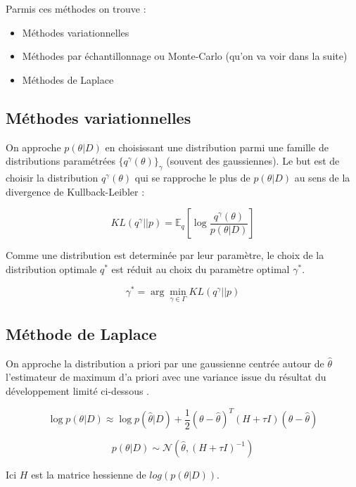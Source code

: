 \documentclass[french,12pt]{article}
\let\oldsubsection\subsection%
\renewcommand{\subsection}{%
  \renewcommand{\theequation}{\thesubsection.\arabic{equation}}%
  \oldsubsection}%
\begin{document}
Parmis ces méthodes on trouve :
\begin{itemize}
    \item Méthodes variationnelles
    \item Méthodes par échantillonnage ou
          Monte-Carlo (qu'on va voir dans la suite)
    \item Méthodes de Laplace
\end{itemize}


\subsection{Méthodes variationnelles}

On approche $p(\theta | D)$ en choisissant une distribution parmi une famille de distributions
paramétrées $\{q^{\gamma}(\theta)\}_{\gamma}$ (souvent des gaussiennes).
Le but est de choisir la distribution $q^{\gamma}(\theta)$ qui se rapproche 
le plus de $p(\theta | D)$ au sens de la divergence de Kullback-Leibler :

\begin{equation}
    KL(q^{\gamma}||p) = \mathbb{E}_q \left[\log \frac{q^{\gamma}(\theta)}{p(\theta | D)}\right]  
\end{equation}

Comme une distribution est determinée par leur paramètre, le choix de la distribution  optimale $q^*$
est réduit au choix du paramètre optimal $\gamma^*$.

\begin{equation}
    \gamma^* = \arg \min_{\gamma \in \Gamma} KL(q^{\gamma}||p) 
\end{equation}


\subsection{Méthode de Laplace}

On approche la distribution a priori par une gaussienne
centrée autour de $\hat{\theta}$ l'estimateur de maximum d'a priori
avec une variance issue du résultat du développement limité ci-dessous \cite{Uncertainty_Deep} .

$$\log p(\theta | D) \approx \log p(\hat{\theta} | D)
    + \frac{1}{2} (\theta - \hat{\theta})^T (H + \tau I)
    (\theta - \hat{\theta})$$

$$p(\theta | D) \sim \mathcal{N}(\hat{\theta}, (H + \tau I)^{-1})$$

Ici $H$ est la matrice hessienne de $log( p (\theta | D ))$.
\end{document}
